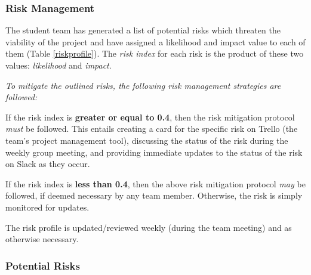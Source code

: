 \subsubsection{Risk Management}
The student team has generated a list of potential risks which threaten the viability of the project and have assigned a likelihood and impact value to each of them (Table \ref{riskprofile}). The \textit{risk index} for each risk is the product of these two values: \textit{likelihood} and \textit{impact}.

\textit{To mitigate the outlined risks, the following risk management strategies are followed:}


If the risk index is \textbf{greater or equal to 0.4}, then the risk mitigation protocol \textit{must} be followed. This entails creating a card for the specific risk on Trello (the team's project management tool), discussing the status of the risk during the weekly group meeting, and providing immediate updates to the status of the risk on Slack as they occur.

If the risk index is \textbf{less than 0.4}, then the above risk mitigation protocol \textit{may} be followed, if deemed necessary by any team member. Otherwise, the risk is simply monitored for updates.

The risk profile is updated/reviewed weekly (during the team meeting) and as otherwise necessary. 


\subsubsection{Potential Risks}

